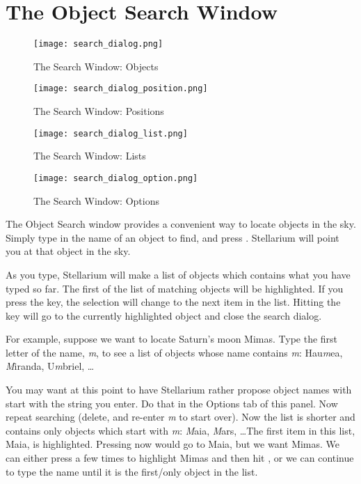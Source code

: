 \section{The Object Search Window}
\label{sec:gui:search}

\begin{figure}[p]
\centering\texttt{[image: search\_dialog.png]}
\caption{The Search Window: Objects}
\label{fig:gui:search}
\end{figure}

\begin{figure}[p]
\centering\texttt{[image: search\_dialog\_position.png]}
\caption{The Search Window: Positions}
\label{fig:gui:search:position}
\end{figure}

\begin{figure}[p]
\centering\texttt{[image: search\_dialog\_list.png]}
\caption{The Search Window: Lists}
\label{fig:gui:search:lists}
\end{figure}


\begin{figure}[tp]
\centering\texttt{[image: search\_dialog\_option.png]}
\caption{The Search Window: Options}
\label{fig:gui:search:options}
\end{figure}

The Object Search window provides a convenient way to locate objects
in the sky. Simply type in the name of an object to find, and press
\key{\return}. Stellarium will point you at that object in the sky.

As you type, Stellarium will make a list of objects which contains 
what you have typed so far. The first of the list of matching objects
will be highlighted. If you press the \key{\tab} key, the selection will change
to the next item in the list. Hitting the \key{\return} key will go to the
currently highlighted object and close the search dialog.

For example, suppose we want to locate Saturn's moon Mimas. 
Type the first letter of the name, \emph{m}, to see a list
of objects whose name contains \emph{m}: Hau\emph{m}ea, \emph{M}iranda, U\emph{m}briel, \ldots 

You may want at this point to have Stellarium rather propose object
names with start with the string you enter. Do that in the Options tab
of this panel. Now repeat searching (delete, and re-enter \emph{m} to start
over). Now the list is shorter and contains only objects which start
with \emph{m}: \emph{M}aia, \emph{M}ars, \ldots The first item in this list, Maia, is
highlighted. Pressing \key{\return} now would go to Maia, but we want
Mimas. We can either press \key{\tab} a few times to highlight Mimas
and then hit \key{\return}, or we can continue to type the name until
it is the first/only object in the list.

